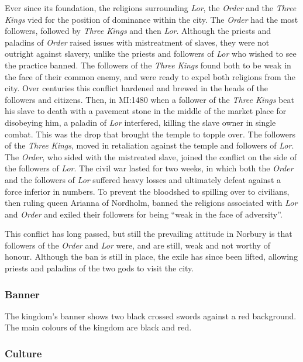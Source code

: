 Ever since its foundation, the religions surrounding \emph{Lor}, the
\emph{Order} and the \emph{Three Kings} vied for the position of dominance
within the city. The \emph{Order} had the most followers, followed by
\emph{Three Kings} and then \emph{Lor}. Although the priests and paladins of
\emph{Order} raised issues with mistreatment of slaves, they were not outright
against slavery, unlike the priests and followers of \emph{Lor} who wished
to see the practice banned. The followers of the \emph{Three Kings} found both
to be weak in the face of their common enemy, and were ready to expel both
religions from the city. Over centuries this conflict hardened and brewed in
the heads of the followers and citizens. Then, in MI:1480 when a follower of
the \emph{Three Kings} beat his slave to death with a pavement stone in the
middle of the market place for disobeying him, a paladin of \emph{Lor}
interfered, killing the slave owner in single combat. This was the drop that
brought the temple to topple over. The followers of the \emph{Three Kings},
moved in retaliation against the temple and followers of \emph{Lor}. The
\emph{Order}, who sided with the mistreated slave, joined the conflict on the
side of the followers of \emph{Lor}. The civil war lasted for two weeks, in
which both the \emph{Order} and the followers of \emph{Lor} suffered heavy
losses and ultimately defeat against a force inferior in numbers. To prevent
the bloodshed to spilling over to civilians, then ruling queen Arianna of
Nordholm, banned the religions associated with \emph{Lor} and \emph{Order} and
exiled their followers for being ``weak in the face of adversity''.

This conflict has long passed, but still the prevailing attitude in Norbury is
that followers of the \emph{Order} and \emph{Lor} were, and are still, weak
and not worthy of honour. Although the ban is still in place, the exile has
since been lifted, allowing priests and paladins of the two gods to visit the
city.

\subsubsection*{Banner}

The kingdom's banner shows two black crossed swords against a red background.
The main colours of the kingdom are black and red.

\subsubsection*{Culture}

